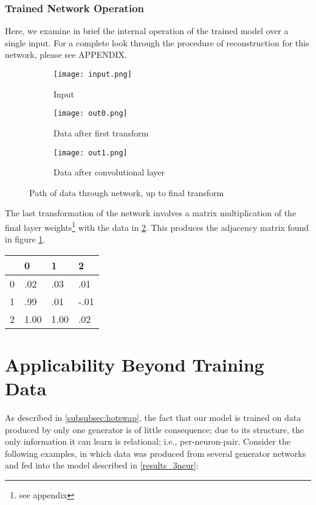 \subsubsection{Trained Network Operation}
Here, we examine in brief the internal operation of the trained model over a 
single input. For a complete look through the procedure of reconstruction for 
this network, please see APPENDIX.
\begin{figure}[h]
	\centering
	\begin{subfigure}{.15\textwidth}
		\centering
		\texttt{[image: input.png]}
		\caption{Input}
		\label{subfig:3neur_in}
	\end{subfigure}
	\hspace{1em}
	\begin{subfigure}{.3\textwidth}
		\texttt{[image: out0.png]}
		\caption{Data after first transform}
	\end{subfigure}
	\hspace{1em}
	\begin{subfigure}{.3\textwidth}
		\texttt{[image: out1.png]}
		\caption{Data after convolutional layer}
		\label{subfig:3neur_out1}
	\end{subfigure}
	\caption{Path of data through network, up to final transform}
	\label{fig:3neur_input}
\end{figure}

The last transformation of the network involves a matrix multiplication of the 
final layer weights\footnote{see appendix} with the data in 
\ref{subfig:3neur_out1}. This produces the adjacency matrix found in figure 
\ref{fig:3neur_pred}.

\begin{table}[h]
	\centering
	\begin{tabular}{l|lll}
		  & 0 & 1 & 2\\
		\hline
		0 & .02 & .03 & .01\\
		1 & .99 & .01 & -.01\\
		2 & 1.00 & 1.00 & .02
	\end{tabular}
	\label{fig:3neur_pred}
\end{table}

\section{Applicability Beyond Training Data}
As described in \ref{subsubsec:hotswap}, the fact that our model is trained on 
data produced by only one generator is of little consequence; due to its 
structure, the only information it can learn is relational; i.e., 
per-neuron-pair. Consider the following examples, in which data was produced 
from several generator networks and fed into the model described in 
\ref{results_3neur}:


